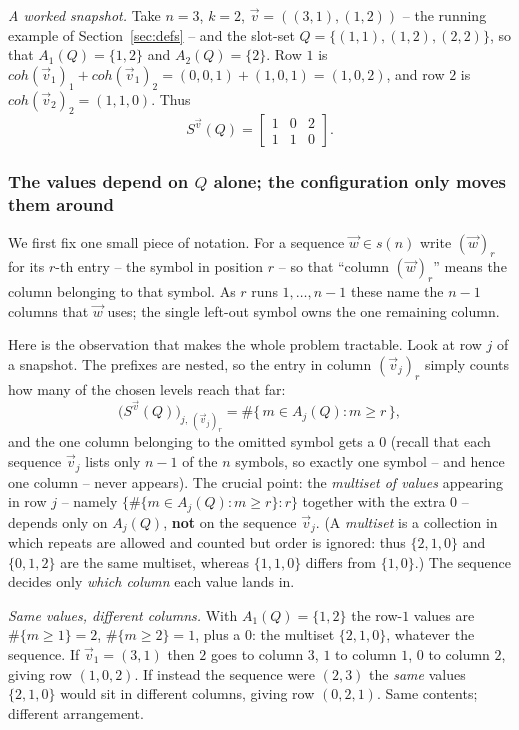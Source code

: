 \medskip
\noindent\textit{A worked snapshot.}  Take $n=3$, $k=2$, $\vec v=((3,1),(1,2))$ --
the running example of Section~\ref{sec:defs} -- and the slot-set
$Q=\{(1,1),(1,2),(2,2)\}$, so that $A_1(Q)=\{1,2\}$ and $A_2(Q)=\{2\}$.  Row $1$ is
$coh(\vec v_1)_1+coh(\vec v_1)_2=(0,0,1)+(1,0,1)=(1,0,2)$, and row $2$ is
$coh(\vec v_2)_2=(1,1,0)$.  Thus
\[
S^{\vec v}(Q)=\begin{bmatrix}1&0&2\\[1pt]1&1&0\end{bmatrix}.
\]

\subsubsection*{The values depend on $Q$ alone; the configuration only moves them around}

\label{def:wr}We first fix one small piece of notation.  For a sequence $\vec w\in s(n)$ write
$(\vec w)_r$ for its $r$-th entry -- the symbol in position $r$ -- so that
``column $(\vec w)_r$'' means the column belonging to that symbol.  As $r$ runs
$1,\ldots,n-1$ these name the $n-1$ columns that $\vec w$ uses; the single left-out
symbol owns the one remaining column.

Here is the observation that makes the whole problem tractable.  Look at row $j$ of
a snapshot.  The prefixes are nested, so the entry in column $(\vec v_j)_r$ simply
counts how many of the chosen levels reach that far:
\[
\bigl(S^{\vec v}(Q)\bigr)_{j,\,(\vec v_j)_r}
=\#\{\,m\in A_j(Q): m\ge r\,\},
\]
and the one column belonging to the omitted symbol gets a $0$ (recall that each
sequence $\vec v_j$ lists only $n-1$ of the $n$ symbols, so exactly one symbol --
and hence one column -- never appears).  The crucial point:
the \emph{multiset of values} appearing in row $j$ -- namely
$\{\#\{m\in A_j(Q):m\ge r\}: r\}$ together with the extra $0$ -- depends only on
$A_j(Q)$, \textbf{not} on the sequence $\vec v_j$.  \label{def:multiset}(A \emph{multiset} is a
collection in which repeats are allowed and counted but order is ignored: thus
$\{2,1,0\}$ and $\{0,1,2\}$ are the same multiset, whereas $\{1,1,0\}$ differs from
$\{1,0\}$.)  The sequence decides only \emph{which column} each value lands in.

\medskip
\noindent\textit{Same values, different columns.}  With $A_1(Q)=\{1,2\}$ the row-$1$
values are $\#\{m\ge1\}=2$, $\#\{m\ge2\}=1$, plus a $0$: the multiset $\{2,1,0\}$,
whatever the sequence.  If $\vec v_1=(3,1)$ then $2$ goes to column $3$, $1$ to
column $1$, $0$ to column $2$, giving row $(1,0,2)$.  If instead the sequence were
$(2,3)$ the \emph{same} values $\{2,1,0\}$ would sit in different columns, giving
row $(0,2,1)$.  Same contents; different arrangement.

